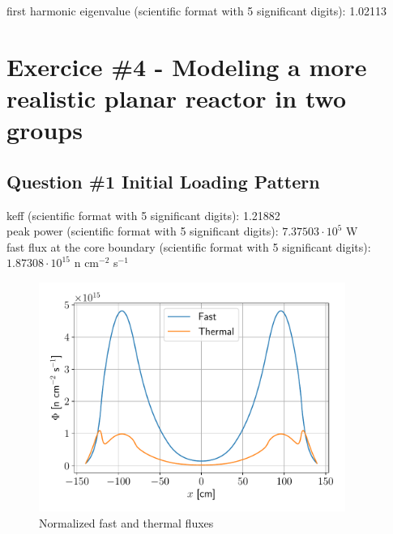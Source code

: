 \documentclass[11pt,a4paper]{article}
\begin{document}
first harmonic eigenvalue (scientific format with 5 significant digits): 1.02113 \\






\newpage
\section{Exercice \#4 - Modeling a more realistic planar reactor in two groups}

\subsection{Question \#1 Initial Loading Pattern}

keff (scientific format with 5 significant digits): 1.21882 \\

peak power (scientific format with 5 significant digits): $7.37503 \cdot 10^5$ W \\

fast flux at the core boundary (scientific format with 5 significant digits): $1.87308 \cdot 10^{15}$ n cm$^{-2}$ s$^{-1}$\\

\begin{figure}[h]
	\includegraphics[width=10cm]{fig/Ex4_Flux.pdf}
	\centering
	\caption{Normalized fast and thermal fluxes}
\end{figure}
\end{document}
